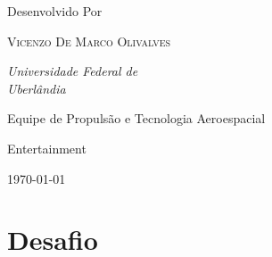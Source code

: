 \documentclass[a4paper, 12pt,  oneside,a4paper,english,french,spanish,brazil]{book}     %
\begin{document}
\begin{titlepage}
\begin{minipage}[h!]{0.6\textwidth}
		\vspace*{3\baselineskip} %
	
	
		Desenvolvido Por
	
		\vspace{0.5\baselineskip} %
	
		{\scshape\Large Vicenzo De Marco Olivalves\\} %
	
		\vspace{0.5\baselineskip} %


            \vspace{0.5\baselineskip}
            
		\textit{Universidade Federal de \\ Uberlândia} %
	
		\vspace{14.8\baselineskip} %
	
		{\large Equipe de Propulsão e Tecnologia Aeroespacial} %
		
		\vspace{0.3\baselineskip} %
		
		Entertainment  %
		
		\vspace{0.3\baselineskip} %
		
		\today %
		
	\end{minipage}

\end{titlepage}

\mainmatter{}
\thispagestyle{empty}    %
\thispagestyle{empty}     %

\newpage

\setcounter{page}{1}

\section*{Desafio}
\end{document}

